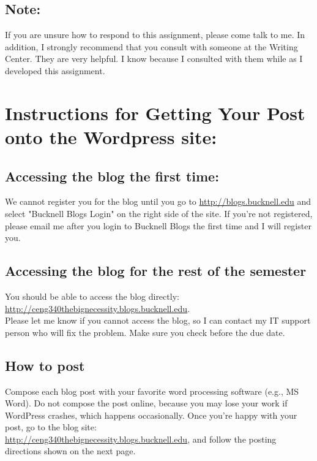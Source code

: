 \documentclass[12pt,letterpaper]{article}
\begin{document}
\subsection *{Note:}
If you are unsure how to respond to this assignment, please come talk to me.  In addition, I strongly recommend that you consult with someone at the Writing Center.  They are very helpful.  I know because I consulted with them while as I developed this assignment.

\section *{Instructions for Getting Your Post onto the Wordpress site:}
\subsection *{Accessing the blog the first time:}
We cannot register you for the blog until you go to \href{http://blogs.bucknell.edu}{http://blogs.bucknell.edu} and select "Bucknell Blogs Login" on the right side of the site.  If you're not registered, please email me after you login to Bucknell Blogs the first time and I will register you.\\
 
\subsection *{Accessing the blog for the rest of the semester}
You should be able to access the blog directly:
\href{http://ceng340thebignecessity.blogs.bucknell.edu}{http://ceng340thebignecessity.blogs.bucknell.edu}.\\

Please let me know if you cannot access the blog, so I can contact my IT support person who will fix the problem. Make sure you check before the due date.

\subsection *{How to post}
Compose each blog post with your favorite word processing software (e.g., MS Word).  Do not compose the post online, because you may lose your work if WordPress crashes, which happens occasionally. Once you're happy with your post, go to the blog site:\\
 \href{http://ceng340thebignecessity.blogs.bucknell.edu}{http://ceng340thebignecessity.blogs.bucknell.edu}, and follow the posting directions shown on the next page.
\end{document}
